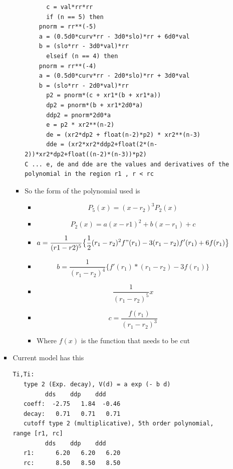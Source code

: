 \documentclass[11pt]{article}
\begin{document}
\begin{enumerate}
\begin{enumerate}
\begin{itemize}
\begin{itemize}
\begin{verbatim}
      c = val*rr*rr
      if (n == 5) then
	pnorm = rr**(-5)
	a = (0.5d0*curv*rr - 3d0*slo)*rr + 6d0*val
	b = (slo*rr - 3d0*val)*rr
      elseif (n == 4) then
	pnorm = rr**(-4)
	a = (0.5d0*curv*rr - 2d0*slo)*rr + 3d0*val
	b = (slo*rr - 2d0*val)*rr
      p2 = pnorm*(c + xr1*(b + xr1*a))
      dp2 = pnorm*(b + xr1*2d0*a)
      ddp2 = pnorm*2d0*a
      e = p2 * xr2**(n-2)
      de = (xr2*dp2 + float(n-2)*p2) * xr2**(n-3)
      dde = (xr2*xr2*ddp2+float(2*(n-2))*xr2*dp2+float((n-2)*(n-3))*p2)
C ... e, de and dde are the values and derivatives of the polynomial in the region r1 , r < rc
\end{verbatim}
\item So the form of the polynomial used is
\begin{itemize}
\item $$ P_5(x) = (x-r_2)^3 P_2(x)  $$
\item \[ P_2(x) = a(x-r1)^2 + b(x-r_1) + c \]
\item \[ a = \frac{1}{ (r1-r2)^5 } \big\{  \frac{1}{2}(r_1-r_2)^2f"(r_1) -3(r_1-r_2)f'(r_1) + 6f(r_1) \big\} \]
\item \[  b = \frac{1}{(r_1-r_2)^4} \big\{ f'(r_1)*(r_1-r_2) - 3f(r_1) \big\}  \]
\item \[ \frac{1}{(r_1 - r_2)^5} x \]
\item \[  c = \frac{ f(r_1) }{ (r_1-r_2)^3} \]
\item Where \(f(x)\) is the function that needs to be cut
\end{itemize}
\end{itemize}
\item Current model has this
\begin{verbatim}
Ti,Ti:
   type 2 (Exp. decay), V(d) = a exp (- b d)
	     dds    ddp    ddd
   coeff:  -2.75   1.84  -0.46
   decay:   0.71   0.71   0.71
   cutoff type 2 (multiplicative), 5th order polynomial, range [r1, rc]
	     dds    ddp    ddd
   r1:      6.20   6.20   6.20
   rc:      8.50   8.50   8.50

\end{verbatim}
\end{itemize}




\end{enumerate}
\end{enumerate}
\end{document}
